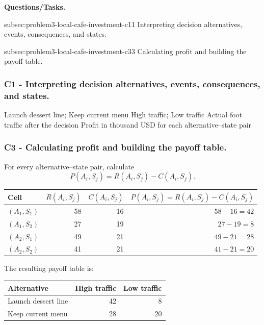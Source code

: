 \textbf{Questions/Tasks.}
\begin{enumerate}
	\CriterionTask
	{subsec:problem3-local-cafe-investment-c1}{1}
	{Interpreting decision alternatives, events, consequences, and states.}

	\CriterionTask
	{subsec:problem3-local-cafe-investment-c3}{3}
	{Calculating profit and building the payoff table.}
\end{enumerate}

\subsubsection*{C1 - Interpreting decision alternatives, events, consequences, and states.}
\label{subsec:problem3-local-cafe-investment-c1}

\DecisionElementsTable
{Launch dessert line; Keep current menu}
{High traffic; Low traffic}
{Actual foot traffic after the decision}
{Profit in thousand USD for each alternative--state pair}


\subsubsection*{C3 - Calculating profit and building the payoff table.}
\label{subsec:problem3-local-cafe-investment-c3}

For every alternative--state pair, calculate
\[
P(A_i,S_j)=R(A_i,S_j)-C(A_i,S_j).
\]

\begin{center}
	\small
	\begin{tabular}{lrrr}
		\toprule
		Cell
		& \(R(A_i,S_j)\)
		& \(C(A_i,S_j)\)
		& \(P(A_i,S_j)=R(A_i,S_j)-C(A_i,S_j)\) \\
		\midrule
		\((A_1,S_1)\) & 58 & 16 & \(58-16=42\) \\
		\((A_1,S_2)\) & 27 & 19 & \(27-19=8\) \\
		\((A_2,S_1)\) & 49 & 21 & \(49-21=28\) \\
		\((A_2,S_2)\) & 41 & 21 & \(41-21=20\) \\
		\bottomrule
	\end{tabular}
\end{center}

The resulting payoff table is:

\begin{center}
	\begin{tabular}{lrr}
		\toprule
		Alternative & High traffic & Low traffic \\
		\midrule
		Launch dessert line & 42 & 8 \\
		Keep current menu & 28 & 20 \\
		\bottomrule
	\end{tabular}
\end{center}

